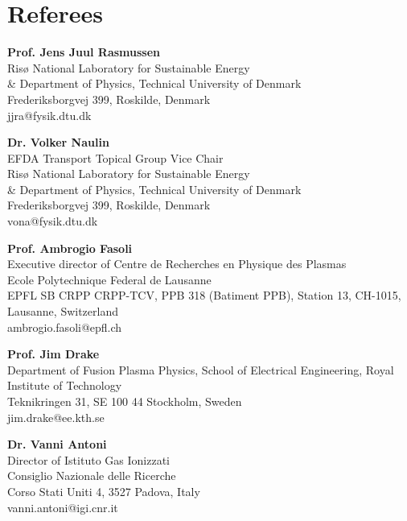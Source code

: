 \section{Referees}

\vspace{.5cm}

\textbf{Prof. Jens Juul Rasmussen} \\
Ris{\o} National Laboratory for Sustainable Energy \\
\& Department of Physics, Technical University of Denmark \\
Frederiksborgvej 399, Roskilde, Denmark\\
jjra@fysik.dtu.dk

\vspace{1cm}

\textbf{Dr. Volker Naulin} \\
EFDA Transport Topical Group Vice Chair \\
Ris{\o} National Laboratory for Sustainable Energy \\
\& Department of Physics, Technical University of Denmark \\
Frederiksborgvej 399, Roskilde, Denmark\\
vona@fysik.dtu.dk

\vspace{1cm}


\textbf{Prof. Ambrogio Fasoli}\\
Executive director of Centre de Recherches en Physique des Plasmas \\
Ecole Polytechnique Federal de Lausanne \\
EPFL SB CRPP CRPP-TCV,  PPB 318 (Batiment PPB), Station 13, CH-1015,
Lausanne, Switzerland\\
ambrogio.fasoli@epfl.ch

\vspace{1cm}

\textbf{Prof. Jim Drake}\\
Department of Fusion Plasma Physics, School of Electrical Engineering, Royal Institute of Technology \\
Teknikringen 31, SE 100 44 Stockholm, Sweden \\
jim.drake@ee.kth.se

\vspace{1cm}

\textbf{Dr. Vanni Antoni}\\
Director of Istituto Gas Ionizzati \\
Consiglio Nazionale delle Ricerche \\
Corso Stati Uniti 4, 3527 Padova, Italy \\
vanni.antoni@igi.cnr.it
